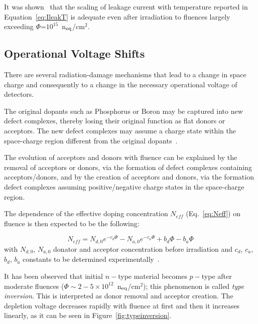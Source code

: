 It was shown~\cite{Chilingarov_tscale} that the scaling of leakage current with temperature 
reported in Equation~\ref{eq:IleakT} is adequate even after irradiation 
to fluences largely exceeding $\Phi$=$10^{15}$~n$_{\rm eq}$/cm$^2$.
 
\subsection{Operational Voltage Shifts}

There are several radiation-damage mechanisms that lead to a change in space charge and 
consequently to a change in the necessary operational voltage of detectors.

The original dopants such as Phosphorus or Boron may be captured into new defect complexes, 
thereby losing their original function as flat donors or acceptors. The new defect complexes may 
assume a charge state within the space-charge region different from the original 
dopants~\cite{Lutz:411172}.

The evolution of acceptors and donors with fluence can be explained by the removal of acceptors 
or donors, via the formation of defect complexes containing acceptors/donors, and by the 
creation of acceptors and donors, via the formation defect complexes assuming positive/negative 
charge states in the space-charge region.

The dependence of the effective doping concentration $N_{eff}$ (Eq.~\ref{eq:Neff}) on fluence is then 
expected to be the following:

\begin{equation}
N_{eff}=N_{d,0}e^{-c_d\Phi}-N_{a,0}e^{-c_a\Phi}+b_d\Phi-b_a\Phi
\label{eq:Neff_Fl}
\end{equation}
with $N_{d,0}$, $N_{a,0}$ donator and acceptor concentration before irradiation and $c_d$,
$c_a$, $b_d$, $b_a$ constants to be determined experimentally~\cite{Lutz:411172}.
 
 It has been observed that initial $n-$type material becomes $p-$type after moderate fluences 
 ($\Phi\sim2-5\times10^{12}$~n$_{\rm eq}$/cm$^2$); this phenomenon is called {\it type inversion}. 
 This is interpreted as donor removal and acceptor creation. The depletion voltage decreases rapidly 
 with fluence at 
 first and then it increases linearly, as it can be seen in Figure~\ref{fig:typeinversion}.
 

